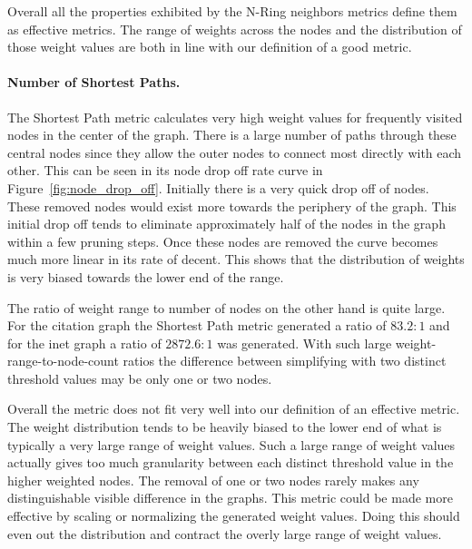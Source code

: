 Overall all the properties exhibited by the N-Ring neighbors metrics define them as effective  metrics.  The range of weights across the nodes and the distribution of those weight values are both in line with our definition of a good metric.

\paragraph*{Number of Shortest Paths.}
The Shortest Path metric calculates very high weight values for frequently visited nodes in the center of the graph.  There is a large number of paths through these central nodes since they allow the outer nodes to connect most directly with each other.  This can be seen in its node drop off rate curve in Figure~\ref{fig:node_drop_off}.  Initially there is a very quick drop off of nodes. These removed nodes would exist more towards the periphery of the graph.  This initial drop off tends to eliminate approximately half of the nodes in the graph within a few pruning steps.  Once these nodes are removed the curve becomes much more linear in its rate of decent.  This shows that the distribution of weights is very biased towards the lower end of the range.

The ratio of weight range to number of nodes on the other hand is quite large.  For the citation graph the Shortest Path metric generated a ratio of $83.2:1$ and for the inet graph a ratio of $2872.6:1$ was generated.  With such large weight-range-to-node-count ratios the difference between simplifying with two distinct threshold values may be only one or two nodes.

Overall the metric does not fit very well into our definition of an effective metric.  The weight distribution tends to be heavily biased to the lower end of what is typically a very large range of weight values.  Such a large range of weight values actually gives too much granularity between each distinct threshold value in the higher weighted nodes.  The removal of one or two nodes rarely makes any distinguishable visible difference in the graphs.  This metric could be made more effective by scaling or normalizing the generated weight values.  Doing this should even out the distribution and contract the overly large range of weight values.

